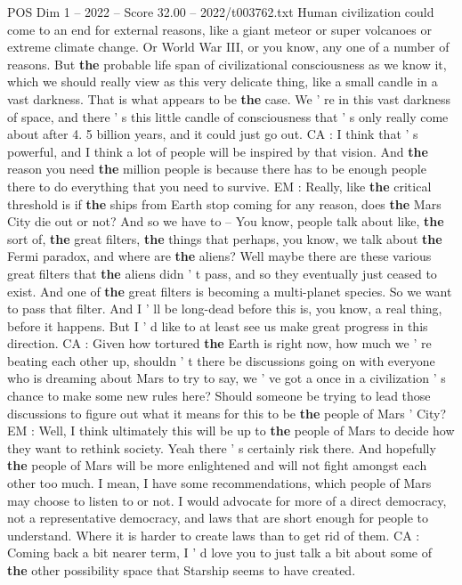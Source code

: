 \begin{textsample}{POS Dim 1 – 2022 – Score 32.00 – 2022/t003762.txt}
Human civilization could come to an end for external reasons, like a giant meteor or super volcanoes or extreme climate change.
Or World War III, or you know, any one of a number of reasons.
But \textbf{the} probable life span of civilizational consciousness as we know it, which we should really view as this very delicate thing, like a small candle in a vast darkness.
That is what appears to be \textbf{the} case.
We ' re in this vast darkness of space, and there ' s this little candle of consciousness that ' s only really come about after 4. 5 billion years, and it could just go out.
CA : I think that ' s powerful, and I think a lot of people will be inspired by that vision.
And \textbf{the} reason you need \textbf{the} million people is because there has to be enough people there to do everything that you need to survive.
EM : Really, like \textbf{the} critical threshold is if \textbf{the} ships from Earth stop coming for any reason, does \textbf{the} Mars City die out or not?
And so we have to -- You know, people talk about like, \textbf{the} sort of, \textbf{the} great filters, \textbf{the} things that perhaps, you know, we talk about \textbf{the} Fermi paradox, and where are \textbf{the} aliens?
Well maybe there are these various great filters that \textbf{the} aliens didn ' t pass, and so they eventually just ceased to exist.
And one of \textbf{the} great filters is becoming a multi-planet species.
So we want to pass that filter.
And I ' ll be long-dead before this is, you know, a real thing, before it happens.
But I ' d like to at least see us make great progress in this direction.
CA : Given how tortured \textbf{the} Earth is right now, how much we ' re beating each other up, shouldn ' t there be discussions going on with everyone who is dreaming about Mars to try to say, we ' ve got a once in a civilization ' s chance to make some new rules here?
Should someone be trying to lead those discussions to figure out what it means for this to be \textbf{the} people of Mars ' City?
EM : Well, I think ultimately this will be up to \textbf{the} people of Mars to decide how they want to rethink society.
Yeah there ' s certainly risk there.
And hopefully \textbf{the} people of Mars will be more enlightened and will not fight amongst each other too much.
I mean, I have some recommendations, which people of Mars may choose to listen to or not.
I would advocate for more of a direct democracy, not a representative democracy, and laws that are short enough for people to understand.
Where it is harder to create laws than to get rid of them.
CA : Coming back a bit nearer term, I ' d love you to just talk a bit about some of \textbf{the} other possibility space that Starship seems to have created.

\end{textsample}
